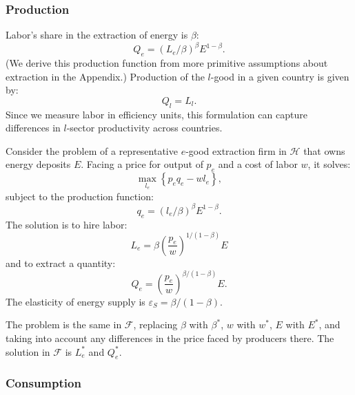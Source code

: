 \documentclass[notitlepage,12pt]{article}
\begin{document}
\subsubsection{Production}

Labor's share in the extraction of energy is $\beta $:%
\begin{equation}
Q_{e}=\left( L_{e}/\beta \right) ^{\beta }E^{1-\beta }.  \label{e production}
\end{equation}%
(We derive this production function from more primitive assumptions about
extraction in the Appendix.) Production of the $l$-good in a given country
is given by:%
\begin{equation*}
Q_{l}=L_{l}.
\end{equation*}%
Since we measure labor in efficiency units, this formulation can capture
differences in $l$-sector productivity across countries.

Consider the problem of a representative $e$-good extraction firm in $%
\mathcal{H}$ that owns energy deposits $E$. Facing a price for output of $%
p_{e}$ and a cost of labor $w$, it solves:%
\begin{equation*}
\max_{l_{e}}\left\{ p_{e}q_{e}-wl_{e}\right\} ,
\end{equation*}%
subject to the production function:%
\begin{equation*}
q_{e}=\left( l_{e}/\beta \right) ^{\beta }E^{1-\beta }.
\end{equation*}%
The solution is to hire labor:%
\begin{equation*}
L_{e}=\beta \left( \frac{p_{e}}{w}\right) ^{1/(1-\beta )}E
\end{equation*}%
and to extract a quantity:%
\begin{equation*}
Q_{e}=\left( \frac{p_{e}}{w}\right) ^{\beta /(1-\beta )}E.
\end{equation*}%
The elasticity of energy supply is $\varepsilon _{S}=\beta /(1-\beta )$.

The problem is the same in $\mathcal{F}$, replacing $\beta $ with $\beta
^{\ast }$, $w$ with $w^{\ast }$, $E$ with $E^{\ast }$, and taking into
account any differences in the price faced by producers there. The solution
in $\mathcal{F}$ is $L_{e}^{\ast }$ and $Q_{e}^{\ast }$.

\subsubsection{Consumption}
\end{document}
